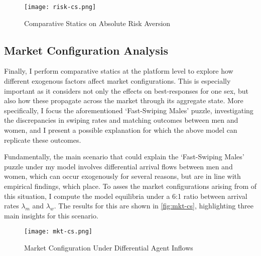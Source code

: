 \begin{figure}[ht]
    \centering
    \caption{Comparative Statics on Absolute Risk Aversion}
    \texttt{[image: risk-cs.png]}
    \label{fig:risk-cs} 
\end{figure}

\subsection{Market Configuration Analysis}\label{sec:section3.3} 
Finally, I perform comparative statics at the platform level to explore how different exogenous factors affect market configurations. This is especially important as it considers not only the effects on best-responses for one sex, but also how these propagate across the market through its aggregate state. More specifically, I focus the aforementioned `Fast-Swiping Males' puzzle, investigating the discrepancies in swiping rates and matching outcomes between men and women, and I present a possible explanation for which the above model can replicate these outcomes. 

Fundamentally, the main scenario that could explain the `Fast-Swiping Males' puzzle under my model involves differential arrival flows between men and women, which can occur exogenously for several reasons, but are in line with empirical findings, which place. To asses the market configurations arising from of this situation, I compute the model equilibria under a 6:1 ratio between arrival rates $\lambda_m$ and $\lambda_w$. The results for this are shown in \autoref{fig:mkt-cs}, highlighting three main insights for this scenario. 

\begin{figure}[ht]
    \centering
    \caption{Market Configuration Under Differential Agent Inflows}
    \texttt{[image: mkt-cs.png]}
    \label{fig:mkt-cs} 
\end{figure} 

